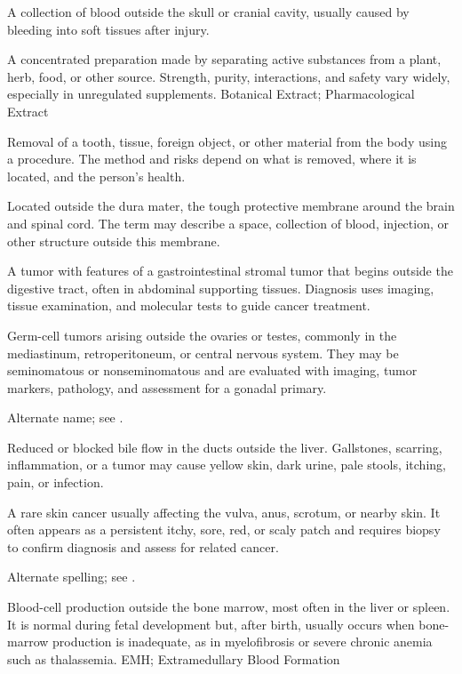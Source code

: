  A collection of blood outside the skull or cranial cavity, usually caused by bleeding into soft tissues after injury.

 A concentrated preparation made by separating active substances from a plant, herb, food, or other source. Strength, purity, interactions, and safety vary widely, especially in unregulated supplements.
\synonyms
Botanical Extract; Pharmacological Extract

 Removal of a tooth, tissue, foreign object, or other material from the body using a procedure. The method and risks depend on what is removed, where it is located, and the person’s health.

 Located outside the dura mater, the tough protective membrane around the brain and spinal cord. The term may describe a space, collection of blood, injection, or other structure outside this membrane.

 A tumor with features of a gastrointestinal stromal tumor that begins outside the digestive tract, often in abdominal supporting tissues. Diagnosis uses imaging, tissue examination, and molecular tests to guide cancer treatment.

 Germ-cell tumors arising outside the ovaries or testes, commonly in the mediastinum, retroperitoneum, or central nervous system. They may be seminomatous or nonseminomatous and are evaluated with imaging, tumor markers, pathology, and assessment for a gonadal primary.

 Alternate name; see .

 Reduced or blocked bile flow in the ducts outside the liver. Gallstones, scarring, inflammation, or a tumor may cause yellow skin, dark urine, pale stools, itching, pain, or infection.

 A rare skin cancer usually affecting the vulva, anus, scrotum, or nearby skin. It often appears as a persistent itchy, sore, red, or scaly patch and requires biopsy to confirm diagnosis and assess for related cancer.

 Alternate spelling; see .

 Blood-cell production outside the bone marrow, most often in the liver or spleen. It is normal during fetal development but, after birth, usually occurs when bone-marrow production is inadequate, as in myelofibrosis or severe chronic anemia such as thalassemia.
\synonyms
EMH; Extramedullary Blood Formation

